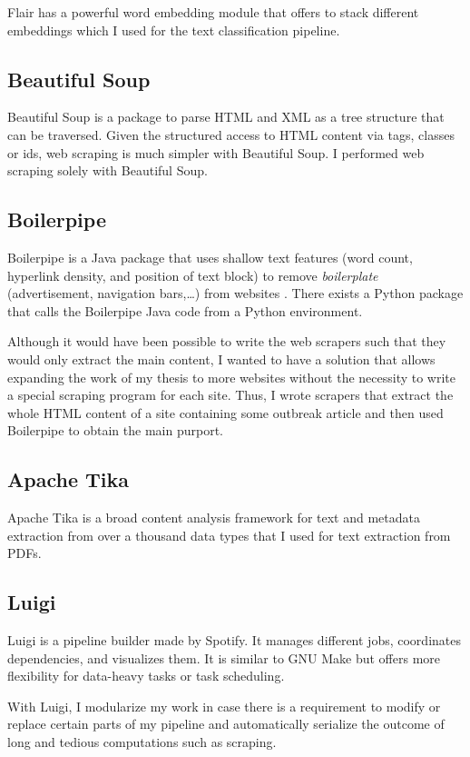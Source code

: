   Flair has a powerful word embedding module that offers to stack different embeddings which I used for the text classification pipeline.

\subsection{Beautiful Soup}
  Beautiful Soup is a package to parse HTML and XML as a tree structure that can be traversed.
  Given the structured access to HTML content via tags, classes or ids, web scraping is much simpler with Beautiful Soup.
  I performed web scraping solely with Beautiful Soup.

\subsection{Boilerpipe}
  Boilerpipe is a Java package that uses shallow text features (word count, hyperlink density, and position of text block) to remove \emph{boilerplate} (advertisement, navigation bars,\dots) from websites \citep{Kohlschutter2010}.
  There exists a Python package that calls the Boilerpipe Java code from a Python environment.

  Although it would have been possible to write the web scrapers such that they would only extract the main content, I wanted to have a solution that allows expanding the work of my thesis to more websites without the necessity to write a special scraping program for each site.
  Thus, I wrote scrapers that extract the whole HTML content of a site containing some outbreak article and then used Boilerpipe to obtain the main purport.

\subsection{Apache Tika}\label{Tika}
  Apache Tika is a broad content analysis framework for text and metadata extraction from over a thousand data types that I used for text extraction from PDFs.

\subsection{Luigi}
  Luigi is a pipeline builder made by Spotify.
  It manages different jobs, coordinates dependencies, and visualizes them.
  It is similar to GNU Make but offers more flexibility for data-heavy tasks or task scheduling.

  With Luigi, I modularize my work in case there is a requirement to modify or replace certain parts of my pipeline and automatically serialize the outcome of long and tedious computations such as scraping.

